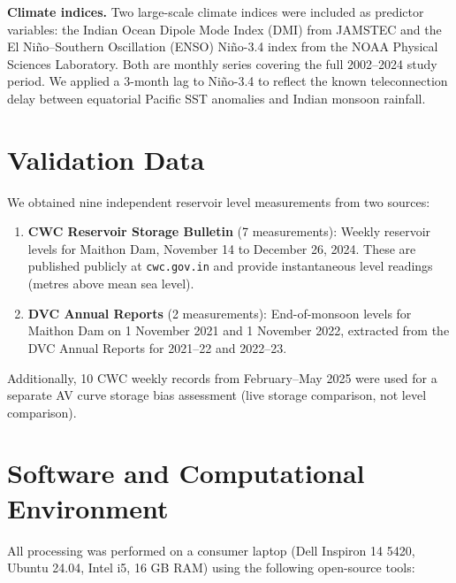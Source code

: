 \documentclass[12pt,a4paper,oneside]{report}
\begin{document}
\textbf{Climate indices.} Two large-scale climate indices were included as
predictor variables: the Indian Ocean Dipole Mode Index (DMI) from JAMSTEC
and the El Ni\~{n}o--Southern Oscillation (ENSO) Ni\~{n}o-3.4 index from
the NOAA Physical Sciences Laboratory. Both are monthly series covering the
full 2002--2024 study period. We applied a 3-month lag to Ni\~{n}o-3.4 to
reflect the known teleconnection delay between equatorial Pacific SST
anomalies and Indian monsoon rainfall.

\section{Validation Data}

We obtained nine independent reservoir level measurements from two sources:

\begin{enumerate}[leftmargin=*]
  \item \textbf{CWC Reservoir Storage Bulletin} (7 measurements): Weekly
    reservoir levels for Maithon Dam, November 14 to December 26, 2024.
    These are published publicly at \texttt{cwc.gov.in} and provide
    instantaneous level readings (metres above mean sea level).

  \item \textbf{DVC Annual Reports} (2 measurements): End-of-monsoon levels
    for Maithon Dam on 1 November 2021 and 1 November 2022, extracted from
    the DVC Annual Reports for 2021--22 and 2022--23.
\end{enumerate}

Additionally, 10 CWC weekly records from February--May 2025 were used for
a separate AV curve storage bias assessment (live storage comparison, not
level comparison).

\section{Software and Computational Environment}

All processing was performed on a consumer laptop (Dell Inspiron 14 5420,
Ubuntu 24.04, Intel i5, 16 GB RAM) using the following open-source tools:
\end{document}
